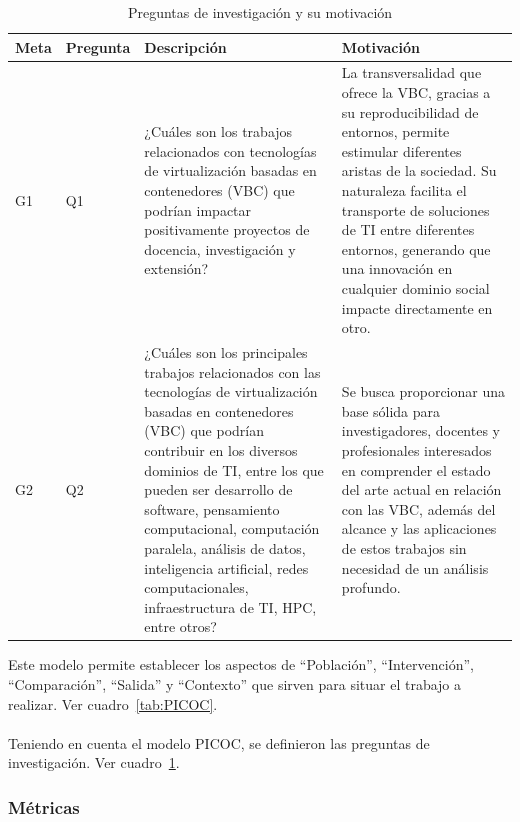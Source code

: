 \begin{table}[!t]
\centering

\renewcommand{\arraystretch}{1.4}
\begin{tabularx}{\textwidth}{>{\centering\arraybackslash}m{} >{\centering\arraybackslash}m{} >{\RaggedRight\arraybackslash}X >{\RaggedRight\arraybackslash}X}
\toprule
\textbf{Meta} & \textbf{Pregunta} & \textbf{Descripción} & \textbf{Motivación} \\
\midrule
G1 & Q1 & ¿Cuáles son los trabajos relacionados con tecnologías de virtualización basadas en contenedores (VBC) que podrían impactar positivamente proyectos de docencia, investigación y extensión? & La transversalidad que ofrece la VBC, gracias a su reproducibilidad de entornos, permite estimular diferentes aristas de la sociedad. Su naturaleza facilita el transporte de soluciones de TI entre diferentes entornos, generando que una innovación en cualquier dominio social impacte directamente en otro. \\
\midrule
G2 & Q2 & ¿Cuáles son los principales trabajos relacionados con las tecnologías de virtualización basadas en contenedores (VBC) que podrían contribuir en los diversos dominios de TI, entre los que pueden ser desarrollo de software, pensamiento computacional, computación paralela, análisis de datos, inteligencia artificial, redes computacionales, infraestructura de TI, HPC, entre otros? & Se busca proporcionar una base sólida para investigadores, docentes y profesionales interesados en comprender el estado del arte actual en relación con las VBC, además del alcance y las aplicaciones de estos trabajos sin necesidad de un análisis profundo. \\
\bottomrule
\end{tabularx}
\caption{Preguntas de investigación y su motivación}
\label{tab:preguntas}
\end{table}

Este modelo permite establecer los aspectos de ``Población'', ``Intervención'', ``Comparación'', ``Salida'' y ``Contexto'' que sirven para situar el trabajo a realizar. Ver cuadro~\ref{tab:PICOC}. \\
\\
Teniendo en cuenta el modelo PICOC, se definieron las preguntas de investigación. Ver cuadro~\ref{tab:preguntas}.\\

\subsubsection{Métricas}
\mbox{}\\

